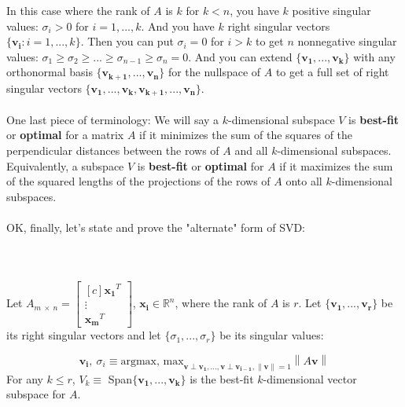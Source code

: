\documentclass{tufte-handout}
\newcommand{\norm}[1]{\left\lVert#1\right\rVert}
\begin{document}
\noindent In this case where the rank of $A$ is $k$ for $k<n$, you have $k$ positive singular values: $\sigma_{i}>0$ for $i=1,...,k$. And you have $k$ right singular vectors $\{\mathbf{v_i}:i=1,...,k\}$. Then you can put $\sigma_{i}=0$ for $i>k$ to get $n$ nonnegative singular values: $\sigma_{1}\geq\sigma_{2}\geq ...\geq\sigma_{n-1}\geq\sigma_{n}=0$. And you can extend $\{\mathbf{v_1},...,\mathbf{v_k}\}$ with any orthonormal basis $\{\mathbf{v_{k+1}},...,\mathbf{v_n}\}$ for the nullspace of $A$ to get a full set of right singular vectors $\{\mathbf{v_1},...,\mathbf{v_k}, \mathbf{v_{k+1}},...,\mathbf{v_n}\}$.\\\leavevmode\\

\noindent One last piece of terminology: We will say a $k$-dimensional subspace $V$ is \textbf{best-fit} or \textbf{optimal} for a matrix $A$ if it minimizes the sum of the squares of the perpendicular distances between the rows of $A$ and all $k$-dimensional subspaces. Equivalently, a subspace $V$ is \textbf{best-fit} or \textbf{optimal} for $A$ if it maximizes the sum of the squared lengths of the projections of the rows of $A$ onto all $k$-dimensional subspaces.\\\leavevmode\\

\noindent OK, finally, let's state and prove the "alternate" form of SVD:\\\leavevmode\\

\\\leavevmode\\
\noindent Let $A_{m~\times~n}=\begin{bmatrix*}[c]
\mathbf{x_1}^T\\\vdots\\\mathbf{x_m}^T
\end{bmatrix*}$, $\mathbf{x_i}\in\mathbb{R}^n$, where the rank of $A$ is $r$. Let $\{\mathbf{v_1},...,\mathbf{v_r}\}$ be its right singular vectors and let $\{\sigma_{1},...,\sigma_{r}\}$ be its singular values:

\[
\mathbf{v_i},~\sigma_{i}\equiv\text{argmax, max}_{\mathbf{v}\perp\mathbf{v_1},...,\mathbf{v}\perp\mathbf{v_{i-1}},\norm{\mathbf{v}}=1}\norm{A\mathbf{v}}
\]
 For any $k\leq r$, $V_k\equiv$ Span$\{\mathbf{v_1},...,\mathbf{v_k}\}$ is the best-fit $k$-dimensional vector subspace for $A$.\\\leavevmode\\
\end{document}
